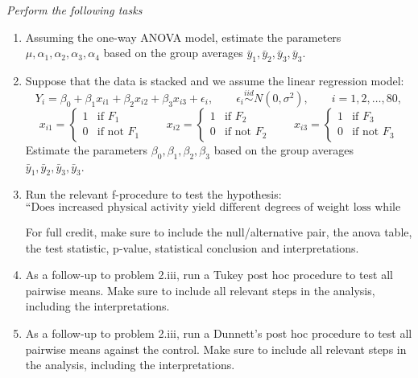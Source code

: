 \documentclass[letterpaper]{article}
\begin{document}
	\emph{Perform the following tasks}
	\begin{enumerate}
		\item[(i)] Assuming the one-way ANOVA model, estimate the parameters $\mu,\alpha_1,\alpha_2,\alpha_3,\alpha_4$ based on the group averages $\bar{y}_1,\bar{y}_2,\bar{y}_3,\bar{y}_3$.
		
		\item[(ii)] Suppose that the data is stacked and we assume the linear regression model:
		\[
		Y_i=\beta_0+\beta_1 x_{i1}+\beta_2 x_{i2}+\beta_3 x_{i3}+\epsilon_i,
		\qquad
		\epsilon_i\overset{iid}{\sim}N(0,\sigma^2),
		\qquad
		i=1,2,\ldots,80,
		\]
		\[
		x_{i1}=
		\begin{cases}
			1 & \text{if } F_1 \\
			0 & \text{if not } F_1
		\end{cases}
		\qquad
		x_{i2}=
		\begin{cases}
			1 & \text{if } F_2 \\
			0 & \text{if not } F_2
		\end{cases}
		\qquad
		x_{i3}=
		\begin{cases}
			1 & \text{if } F_3 \\
			0 & \text{if not } F_3
		\end{cases}
		\]
		Estimate the parameters $\beta_0,\beta_1,\beta_2,\beta_3$ based on the group averages $\bar{y}_1,\bar{y}_2,\bar{y}_3,\bar{y}_3$.
		
		\item[(iii)] Run the relevant f-procedure to test the hypothesis:
		\[
		\text{``Does increased physical activity yield different degrees of weight loss while dieting?''}
		\]
		
		For full credit, make sure to include the null/alternative pair, the anova table, the test statistic, p-value, statistical conclusion and interpretations.
		
		\item[(iv)] As a follow-up to problem 2.iii, run a Tukey post hoc procedure to test all pairwise means. Make sure to include all relevant steps in the analysis, including the interpretations.
		
		\item[(v)] As a follow-up to problem 2.iii, run a Dunnett's post hoc procedure to test all pairwise means against the control. Make sure to include all relevant steps in the analysis, including the interpretations.
		

\end{enumerate}
\end{document}
